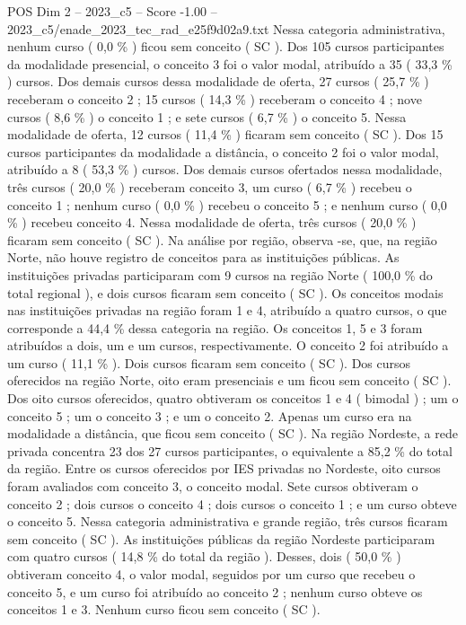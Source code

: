 \begin{textsample}{POS Dim 2 – 2023\_c5 – Score -1.00 – 2023\_c5/enade\_2023\_tec\_rad\_e25f9d02a9.txt}
Nessa categoria administrativa, nenhum curso ( 0,0 \% ) ficou sem conceito ( SC ).
Dos 105 cursos participantes da modalidade presencial, o conceito 3 foi o valor modal, atribuído a 35 ( 33,3 \% ) cursos.
Dos demais cursos dessa modalidade de oferta, 27 cursos ( 25,7 \% ) receberam o conceito 2 ; 15 cursos ( 14,3 \% ) receberam o conceito 4 ; nove cursos ( 8,6 \% ) o conceito 1 ; e sete cursos ( 6,7 \% ) o conceito 5.
Nessa modalidade de oferta, 12 cursos ( 11,4 \% ) ficaram sem conceito ( SC ).
Dos 15 cursos participantes da modalidade a distância, o conceito 2 foi o valor modal, atribuído a 8 ( 53,3 \% ) cursos.
Dos demais cursos ofertados nessa modalidade, três cursos ( 20,0 \% ) receberam conceito 3, um curso ( 6,7 \% ) recebeu o conceito 1 ; nenhum curso ( 0,0 \% ) recebeu o conceito 5 ; e nenhum curso ( 0,0 \% ) recebeu conceito 4.
Nessa modalidade de oferta, três cursos ( 20,0 \% ) ficaram sem conceito ( SC ).
Na análise por região, observa -se, que, na região Norte, não houve registro de conceitos para as instituições públicas.
As instituições privadas participaram com 9 cursos na região Norte ( 100,0 \% do total regional ), e dois cursos ficaram sem conceito ( SC ).
Os conceitos modais nas instituições privadas na região foram 1 e 4, atribuído a quatro cursos, o que corresponde a 44,4 \% dessa categoria na região.
Os conceitos 1, 5 e 3 foram atribuídos a dois, um e um cursos, respectivamente.
O conceito 2 foi atribuído a um curso ( 11,1 \% ).
Dois cursos ficaram sem conceito ( SC ).
Dos cursos oferecidos na região Norte, oito eram presenciais e um ficou sem conceito ( SC ).
Dos oito cursos oferecidos, quatro obtiveram os conceitos 1 e 4 ( bimodal ) ; um o conceito 5 ; um o conceito 3 ; e um o conceito 2.
Apenas um curso era na modalidade a distância, que ficou sem conceito ( SC ).
Na região Nordeste, a rede privada concentra 23 dos 27 cursos participantes, o equivalente a 85,2 \% do total da região.
Entre os cursos oferecidos por IES privadas no Nordeste, oito cursos foram avaliados com conceito 3, o conceito modal.
Sete cursos obtiveram o conceito 2 ; dois cursos o conceito 4 ; dois cursos o conceito 1 ; e um curso obteve o conceito 5.
Nessa categoria administrativa e grande região, três cursos ficaram sem conceito ( SC ).
As instituições públicas da região Nordeste participaram com quatro cursos ( 14,8 \% do total da região ).
Desses, dois ( 50,0 \% ) obtiveram conceito 4, o valor modal, seguidos por um curso que recebeu o conceito 5, e um curso foi atribuído ao conceito 2 ; nenhum curso obteve os conceitos 1 e 3.
Nenhum curso ficou sem conceito ( SC ).

\end{textsample}
